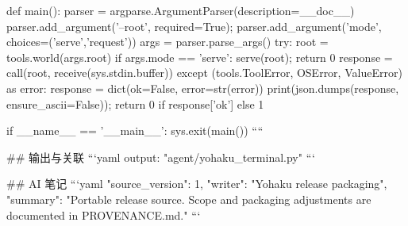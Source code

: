 def main():
    parser = argparse.ArgumentParser(description=__doc__)
    parser.add_argument('--root', required=True); parser.add_argument('mode', choices=('serve','request'))
    args = parser.parse_args()
    try:
        root = tools.world(args.root)
        if args.mode == 'serve': serve(root); return 0
        response = call(root, receive(sys.stdin.buffer))
    except (tools.ToolError, OSError, ValueError) as error:
        response = dict(ok=False, error=str(error))
    print(json.dumps(response, ensure_ascii=False)); return 0 if response['ok'] else 1


if __name__ == '__main__': sys.exit(main())
````

## 输出与关联
```yaml
output: "agent/yohaku_terminal.py"
```

## AI 笔记
```yaml
{"source_version": 1, "writer": "Yohaku release packaging", "summary": "Portable release source. Scope and packaging adjustments are documented in PROVENANCE.md."}
```
